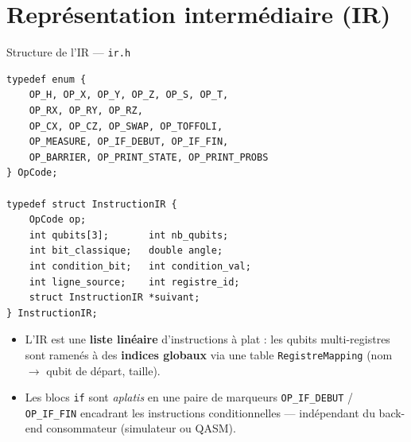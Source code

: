 \documentclass[10pt]{beamer}
\begin{document}
\section{Représentation intermédiaire (IR)}

\begin{frame}[fragile]{Structure de l'IR --- \texttt{ir.h}}
\begin{lstlisting}[style=cstyle]
typedef enum {
    OP_H, OP_X, OP_Y, OP_Z, OP_S, OP_T,
    OP_RX, OP_RY, OP_RZ,
    OP_CX, OP_CZ, OP_SWAP, OP_TOFFOLI,
    OP_MEASURE, OP_IF_DEBUT, OP_IF_FIN,
    OP_BARRIER, OP_PRINT_STATE, OP_PRINT_PROBS
} OpCode;

typedef struct InstructionIR {
    OpCode op;
    int qubits[3];       int nb_qubits;
    int bit_classique;   double angle;
    int condition_bit;   int condition_val;
    int ligne_source;    int registre_id;
    struct InstructionIR *suivant;
} InstructionIR;
\end{lstlisting}
  \begin{itemize}
    \small
    \item L'IR est une \textbf{liste linéaire} d'instructions à plat : les qubits multi-registres sont ramenés à des \textbf{indices globaux} via une table \texttt{RegistreMapping} (nom $\to$ qubit de départ, taille).
    \item Les blocs \texttt{if} sont \emph{aplatis} en une paire de marqueurs \texttt{OP\_IF\_DEBUT} / \texttt{OP\_IF\_FIN} encadrant les instructions conditionnelles --- indépendant du back-end consommateur (simulateur ou QASM).
  \end{itemize}
\end{frame}
\end{document}
